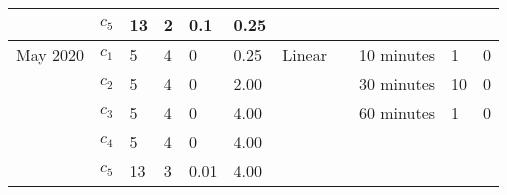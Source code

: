 \begin{table}[htb!]
{\begin{tabular}{llllllll|lll}
     & $c_5$ & 13 & 2 & 0.1 & 0.25 &  &  &  &  &  \\ \hline
    May 2020 & $c_1$ & 5 & 4 & 0 & 0.25 & Linear &  & 10 minutes & 1 & 0 \\
     & $c_2$ & 5 & 4 & 0 & 2.00 &  &  & 30 minutes & 10 & 0 \\
     & $c_3$ & 5 & 4 & 0 & 4.00 &  &  & 60 minutes & 1 & 0 \\
     & $c_4$ & 5 & 4 & 0 & 4.00 &  &  &  &  &  \\
     & $c_5$ & 13 & 3 & 0.01 & 4.00 &  &  &  &  & \\ \hline
    \end{tabular}%
    }
\end{table}